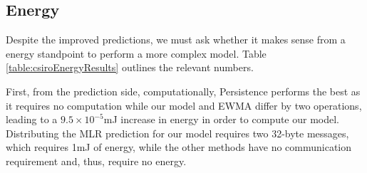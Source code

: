 \documentclass[prodmode,acmtosn]{acmsmall}
\begin{document}
\begin{table*}
\centering
{}
\end{table*}

\subsection{Energy}
Despite the improved predictions, we must ask whether it makes sense from a energy standpoint to perform a more complex model.
Table \ref{table:csiroEnergyResults} outlines the relevant numbers.

First, from the prediction side, computationally, Persistence performs the best as it requires no computation while our model and EWMA differ by two operations, leading to a $9.5\times10^{-5}$mJ increase in energy in order to compute our model.
Distributing the MLR prediction for our model requires two 32-byte messages, which requires 1mJ of energy, while the other methods have no communication requirement and, thus, require no energy.
\end{document}
